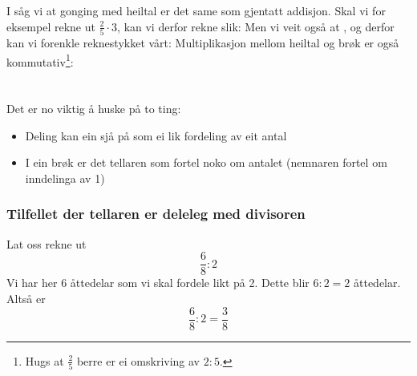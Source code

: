 \section{\brgngheil}
I  såg vi at gonging med heiltal er det same som gjentatt addisjon. Skal vi for eksempel rekne ut $ \frac{2}{5}\cdot 3 $, kan vi derfor rekne slik:
Men vi veit også at , og derfor kan vi forenkle reknestykket vårt:
Multiplikasjon mellom heiltal og brøk er også kommutativ\footnote{Hugs at $ \frac{2}{5} $ berre er ei omskriving av $ 2:5 $. }:

\newpage
{}

\newpage
\section{\brdelheil}
Det er no viktig å huske på to ting:
\begin{itemize}
	\item Deling kan ein sjå på som ei lik fordeling av eit antal
	\item I ein brøk er det tellaren som fortel noko om antalet (nemnaren fortel om inndelinga av 1)
\end{itemize}
\subsubsection{Tilfellet der tellaren er deleleg med divisoren}
Lat oss rekne ut 
\[ \frac{6}{8}:2 \]
Vi har her 6 åttedelar som vi skal fordele likt på 2. Dette blir $ 6:2=2 $ åttedelar.
Altså er
\[ \frac{6}{8}:2=\frac{3}{8} \]
\newpage
